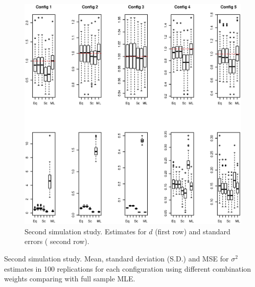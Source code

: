 \documentclass[11pt,a5paper,twoside]{book}
\begin{document}
{\begin{figure}
\centering
\includegraphics[width=\textwidth]{fig_d.eps}
\caption{\small \linespread{1.1} Second simulation study. Estimates for $d$ (first row) and standard errors ( second row).} \label{fig_d}
\end{figure}






\begin{table}[ht]
\centering
\caption{\small \linespread{1.1}Second simulation study. Mean, standard deviation (S.D.) and MSE for $\sigma^2$ estimates in 100 replications for each configuration using different combination weights comparing with full sample MLE.}
\label{tab_sigma2_est}

\vspace*{2mm}


\end{table}}
\end{document}

